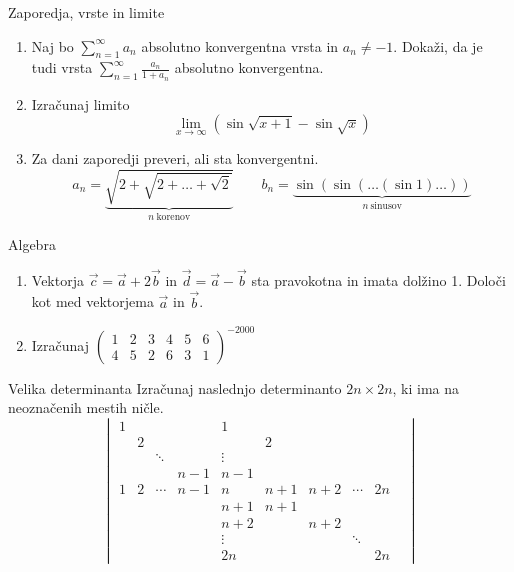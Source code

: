 \begin{frame}{Zaporedja, vrste in limite}
	\begin{enumerate}
		\item 
		Naj bo $\sum_{n=1}^\infty a_n$ absolutno konvergentna vrsta in $a_n \ne -1$.
		Dokaži, da je tudi vrsta $\sum_{n=1}^\infty \frac{a_n}{1+a_n}$
		absolutno konvergentna.

		\item
		Izračunaj limito
		$$
		\lim_{x \to \infty} (\sin\sqrt{x+1} - \sin \sqrt{x})
		$$

		\item
		Za dani zaporedji preveri, ali sta konvergentni.
		$$
		 a_n = \underbrace{\sqrt{2+\sqrt{2+\dots+\sqrt{2}}}}_{n~\text{korenov}} \qquad
		 b_n = \underbrace{\sin(\sin(\dots(\sin 1)\dots))}_{n~\text{sinusov}}
		$$
	\end{enumerate}
\end{frame}

\begin{frame}{Algebra}
	\begin{enumerate}
		\item
		Vektorja $\vec{c} = \vec{a} + 2\vec{b}$ in $\vec{d} = \vec{a} - \vec{b}$
		sta pravokotna in imata dolžino 1. Določi kot med vektorjema $\vec{a}$ in $\vec{b}$.
		\item 
		Izračunaj
	$\begin{pmatrix}1&2&3&4&5&6\\4&5&2&6&3&1\end{pmatrix}^{-2000}$
\end{enumerate}
\end{frame}

\begin{frame}{Velika determinanta}
	Izračunaj naslednjo determinanto $2n \times 2n$, ki ima na neoznačenih mestih ničle.
	$$
	\begin{vmatrix}
  1 &&&& 1 &&&& \\
  & 2 &&&& 2 &&&&  \\
  && \ddots && \vdots &&&& \\
  &&& n-1 & n-1 &&&& \\
  1 & 2 & \cdots & n-1 & n & n+1 & n+2 & \cdots & 2n \\
  &&&& n+1 & n+1 &  \\
  &&&& n+2 && n+2 && \\ 
  &&&& \vdots &&   & \ddots &   &   \\
  &&&& 2n &&&& 2n
\end{vmatrix}
$$
\end{frame}

